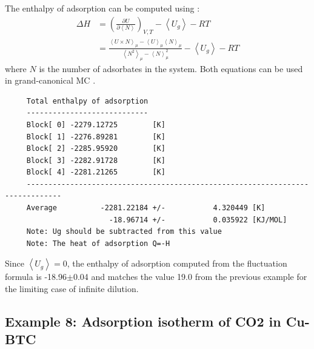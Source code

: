 \noindent
The enthalpy of adsorption can be computed using \cite{Karavias1991,Snurr1993,Vlugt2008}:
\begin{align}
 \Delta H &= \left(\frac{\partial U}{\partial \left\langle N\right\rangle}\right)_{V,T}-
             \left\langle U_g \right\rangle - RT\\
  &=\frac{\left\langle U \times N\right\rangle_\mu - \left\langle U\right\rangle_\mu\left\langle N\right\rangle_\mu}
                {\left\langle N^2\right\rangle_\mu - \left\langle N\right\rangle_\mu^2 }
              - \left\langle U_g \right\rangle - RT\label{Eq: fluctuation formula}
\end{align}
where $N$ is the number of adsorbates in the system.
Both equations can be used in grand-canonical MC \cite{Snurr1993}.
\begin{tiny}
\begin{verbatim}
     Total enthalpy of adsorption
     ----------------------------
     Block[ 0] -2279.12725        [K]
     Block[ 1] -2276.89281        [K]
     Block[ 2] -2285.95920        [K]
     Block[ 3] -2282.91728        [K]
     Block[ 4] -2281.21265        [K]
     ------------------------------------------------------------------------------
     Average          -2281.22184 +/-           4.320449 [K]
                        -18.96714 +/-           0.035922 [KJ/MOL]
     Note: Ug should be subtracted from this value
     Note: The heat of adsorption Q=-H
\end{verbatim}
\end{tiny}
Since $\left\langle U_g \right\rangle=0$, the enthalpy of adsorption computed from the fluctuation formula
is -18.96$\pm$0.04 and matches the value 19.0 from the previous example for the limiting case of infinite dilution.

\subsection*{Example 8: Adsorption isotherm of CO2 in Cu-BTC}


